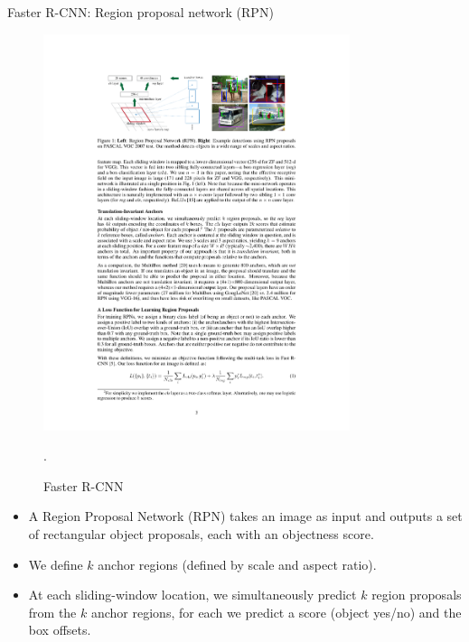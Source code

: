 \documentclass[xcolor=pdftex,dvipsnames,table]{beamer}
\begin{document}
\begin{frame}{Faster R-CNN: Region proposal network (RPN)}
\begin{figure}[htb]
   \centering
   \includegraphics[width=0.8\textwidth]{../graphics/Faster_R-CNN.pdf}
   \caption{Faster R-CNN \cite{Ren2017}}.
\end{figure}
\begin{itemize}
\item A Region Proposal Network (RPN) takes an image as input and outputs a set of rectangular object proposals, each with an objectness score.
\item We define $k$ anchor regions (defined by scale and aspect ratio).
\item At each sliding-window location, we simultaneously predict $k$ region proposals from the $k$ anchor regions, for each we predict a score (object yes/no) and the box offsets.
\end{itemize}
\end{frame}
\end{document}
